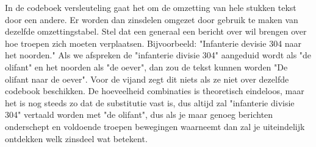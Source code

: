 In de codeboek versleuteling gaat het om de omzetting van hele stukken tekst door een andere. Er worden dan zinsdelen omgezet door gebruik te maken van dezelfde omzettingstabel. Stel dat een generaal een bericht over wil brengen over hoe troepen zich moeten verplaatsen. Bijvoorbeeld: "Infanterie devisie 304 naar het noorden." Als we afspreken de "infanterie divisie 304" aangeduid wordt als "de olifant" en het noorden als "de oever", dan zou de tekst kunnen worden "De olifant naar de oever". Voor de vijand zegt dit niets als ze niet over dezelfde codebook beschikken. De hoeveelheid combinaties is theoretisch eindeloos, maar het is nog steeds zo dat de substitutie vast is, dus altijd zal "infanterie divisie 304" vertaald worden met "de olifant", dus als je maar genoeg berichten onderschept en voldoende troepen bewegingen waarneemt dan zal je uiteindelijk ontdekken welk zinsdeel wat betekent.
